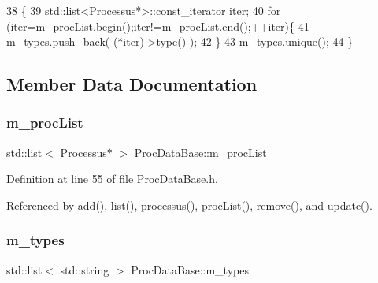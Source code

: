 \begin{DoxyCode}
38                             \{
39   std::list<Processus*>::const\_iterator iter;
40   \textcolor{keywordflow}{for} (iter=\hyperlink{classProcDataBase_a9b7458b811b826c5d264b436c7a391c4}{m\_procList}.begin();iter!=\hyperlink{classProcDataBase_a9b7458b811b826c5d264b436c7a391c4}{m\_procList}.end();++iter)\{
41     \hyperlink{classProcDataBase_a94063cebf50be9a12b8bd9f70e410ed5}{m\_types}.push\_back( (*iter)->type() );
42   \}
43   \hyperlink{classProcDataBase_a94063cebf50be9a12b8bd9f70e410ed5}{m\_types}.unique();
44 \}
\end{DoxyCode}


\subsection{Member Data Documentation}
\mbox{\label{classProcDataBase_a9b7458b811b826c5d264b436c7a391c4}} 
\subsubsection{\texorpdfstring{m\+\_\+proc\+List}{m\_procList}}
{\footnotesize\ttfamily std\+::list$<$ \hyperlink{classProcessus}{Processus}$\ast$ $>$ Proc\+Data\+Base\+::m\+\_\+proc\+List\hspace{0.3cm}{\ttfamily [private]}}



Definition at line 55 of file Proc\+Data\+Base.\+h.



Referenced by add(), list(), processus(), proc\+List(), remove(), and update().

\mbox{\label{classProcDataBase_a94063cebf50be9a12b8bd9f70e410ed5}} 
\subsubsection{\texorpdfstring{m\+\_\+types}{m\_types}}
{\footnotesize\ttfamily std\+::list$<$ std\+::string $>$ Proc\+Data\+Base\+::m\+\_\+types\hspace{0.3cm}{\ttfamily [private]}}



